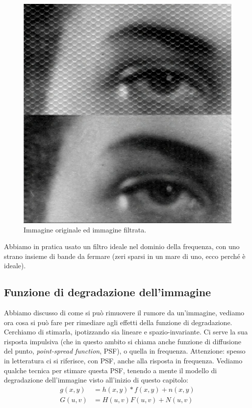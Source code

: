 \documentclass[a4paper,11pt]{article}
\begin{document}
\renewcommand{\thefigure}{8.10}
\begin{figure}[!h]
  \centering
    \includegraphics[scale=0.5]{images/8/photoprint_orig_and_filtered.png}
    \caption{Immagine originale ed immagine filtrata.}
\end{figure}

Abbiamo in pratica usato un filtro ideale nel dominio della frequenza, con uno strano insieme di bande da fermare
(zeri sparsi in un mare di uno, ecco perché è ideale).

\subsection{Funzione di degradazione dell'immagine}
Abbiamo discusso di come si può rimuovere il rumore da un'immagine, vediamo ora cosa si può fare per rimediare agli effetti della funzione di
degradazione. Cerchiamo di stimarla, ipotizzando sia lineare e spazio-invariante. Ci serve la sua risposta impulsiva (che in questo
ambito si chiama anche funzione di diffusione del punto, \textit{point-spread function}, PSF), o quella in frequenza. Attenzione: spesso
in letteratura ci si riferisce, con PSF, anche alla risposta in frequenza.
Vediamo qualche tecnica per stimare questa PSF, tenendo a mente il modello di degradazione dell'immagine visto all'inizio di questo capitolo:
\begin{align*}
    g(x,y) &= h(x,y) \ast f(x,y) + n(x,y) \\
    G(u,v) &= H(u,v) F(u,v) + N(u,v)
\end{align*}
\end{document}
